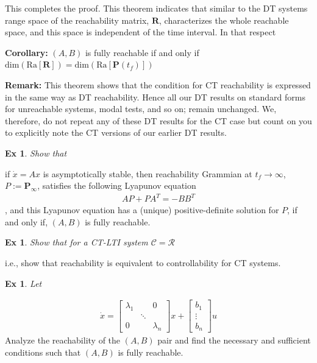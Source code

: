 \documentclass[twoside]{article}
\newtheorem{exmp}[theorem]{Ex}
\begin{document}
%
This completes the proof. This theorem indicates that similar to the DT systems range space of the
reachability matrix, $\mathbf{R}$, characterizes the whole reachable space, and this space is independent
of the time interval. In that respect 

\textbf{Corollary:} $(A,B)$ is fully reachable if and only if $\mathrm{dim} \left( \mathrm{Ra} [ \mathbf{R} ] \right) = \mathrm{dim} \left( \mathrm{Ra} [ \textbf{P}(t_f) ] \right)$

\textbf{Remark:} This theorem shows that the condition for CT reachability is expressed in the same way 
as DT reachability. Hence all our DT results on standard forms for unreachable systems, modal tests, and so on; remain unchanged. We, therefore, do not repeat any of these DT results for the CT case but count on you to explicitly note the CT versions of our earlier DT results.

\begin{exmp}
Show that
\end{exmp}
if $\dot{x} = A x$ is asymptotically stable, then reachability Grammian at $t_f \to \infty$, $P := \mathbf{P}_{\infty}$,
satisfies the following Lyapunov equation
%
\begin{align*}
    A P + P A^T = - B B^T
\end{align*}
% 
, and this Lyapunov equation has a (unique) positive-definite solution for $P$,
if and only if, $(A,B)$ is fully reachable.

\begin{exmp}
Show that for a CT-LTI system $\mathcal{C} = \mathcal{R}$
\end{exmp}
i.e., show that reachability is equivalent to controllability for CT systems. 

\begin{exmp}
Let 
\end{exmp}
%
%
\begin{align*}
    \dot{x} = \begin{bmatrix} \lambda_1 & & 0  \\
    & \ddots &
    \\
    0 & &  \lambda_n 
    \end{bmatrix} x + \begin{bmatrix} b_1 \\ \vdots \\ b_n \end{bmatrix} u
\end{align*}
% 
Analyze the reachability of the $(A,B)$ pair and
find the necessary and sufficient conditions such that 
$(A,B)$ is fully reachable.
\end{document}
